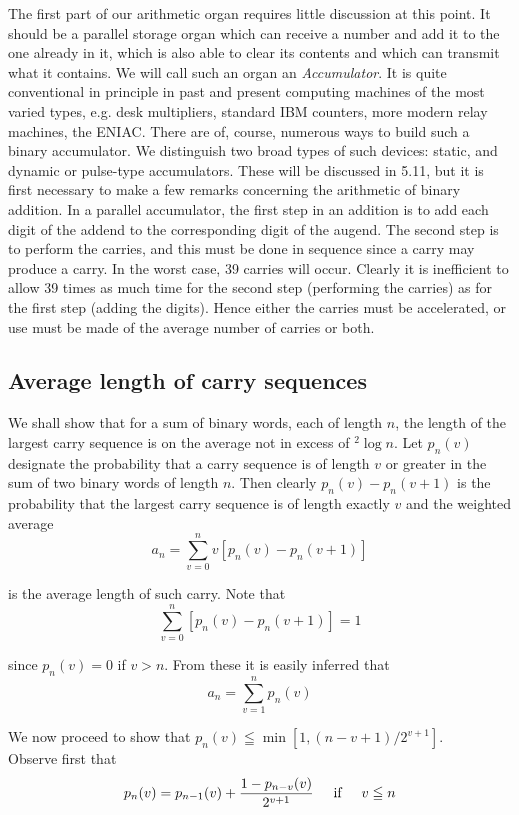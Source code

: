 \documentclass[12pt]{amsart}
\begin{document}
The first part of our arithmetic organ requires little discussion at this point. It should be a parallel storage organ which can receive a number and add it to the one already in it, which is also able to clear its contents and which can transmit what it contains. We will call such an organ an \emph{Accumulator}. It is quite conventional in principle in past and present computing machines of the most varied types, e.g. desk multipliers, standard IBM counters, more modern relay machines, the ENIAC. There are of, course, numerous ways to build such a binary accumulator. We distinguish two broad types of such devices: static, and dynamic or pulse-type accumulators. These will be discussed in 5.11, but it is first necessary to make a few remarks concerning the arithmetic of binary addition. In a parallel accumulator, the first step in an addition is to add each digit of the addend to the corresponding digit of the augend. The second step is to perform the carries, and this must be done in sequence since a carry may produce a carry. In the worst case, 39 carries will occur. Clearly it is inefficient to allow 39 times as much time for the second step (performing the carries) as for the first step (adding the digits). Hence either the carries must be accelerated, or use must be made of the average number of carries or both.

\subsection{Average length of carry sequences}
We shall show that for a sum of binary words, each of length $n$, the length of the largest carry sequence is on the average not in excess of $^2\log n$. Let $p_n(v)$ designate the probability that a carry sequence is of length $v$ or greater in the sum of two binary words of length $n$. Then clearly $p_n(v) - p_n(v + 1)$ is the probability that the largest carry sequence is of length exactly $v$ and the weighted average
\[
a_n = \sum_{v=0}^{n} v[p_n(v) - p_n(v + 1)]
\]

is the average length of such carry. Note that
\[
\sum_{v=0}^{n} [p_n(v) - p_n(v + 1)] = 1
\]

since $p_n(v) = 0$ if $v > n$. From these it is easily inferred that
\[
a_n = \sum_{v=1}^{n} p_n(v)
\]

We now proceed to show that $p_n(v) \leqq \min [1, (n - v + 1)/2^{v + 1}]$. \\ Observe first that
\[
p_n(v) = p_{n-1}(v) + \dfrac{1 - p_{n-v}(v)}{2^{v+1}} \hspace{5 mm} \text{if} \hspace{5 mm} v \leqq n
\]
\end{document}
